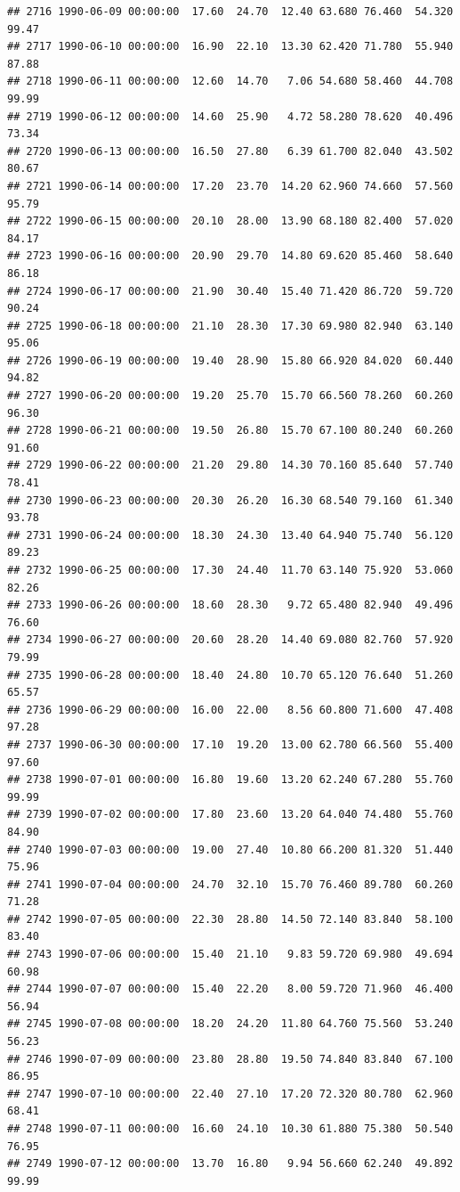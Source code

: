\documentclass{article}\usepackage{graphicx, color}
\makeatletter
\newenvironment{kframe}{%
 \def\at@end@of@kframe{}%
 \ifinner\ifhmode%
  \def\at@end@of@kframe{\end{minipage}}%
  \begin{minipage}{\columnwidth}%
 \fi\fi%
 \def\FrameCommand##1{\hskip\@totalleftmargin \hskip-\fboxsep
 \colorbox{shadecolor}{##1}\hskip-\fboxsep
     \hskip-\linewidth \hskip-\@totalleftmargin \hskip\columnwidth}%
 \MakeFramed {\advance\hsize-\width
   \@totalleftmargin\z@ \linewidth\hsize
   \@setminipage}}%
 {\par\unskip\endMakeFramed%
 \at@end@of@kframe}
\newenvironment{knitrout}{}{} %
\makeatother
\begin{document}
\begin{knitrout}
\begin{kframe}
\begin{verbatim}
## 2716 1990-06-09 00:00:00  17.60  24.70  12.40 63.680 76.460  54.320  99.47
## 2717 1990-06-10 00:00:00  16.90  22.10  13.30 62.420 71.780  55.940  87.88
## 2718 1990-06-11 00:00:00  12.60  14.70   7.06 54.680 58.460  44.708  99.99
## 2719 1990-06-12 00:00:00  14.60  25.90   4.72 58.280 78.620  40.496  73.34
## 2720 1990-06-13 00:00:00  16.50  27.80   6.39 61.700 82.040  43.502  80.67
## 2721 1990-06-14 00:00:00  17.20  23.70  14.20 62.960 74.660  57.560  95.79
## 2722 1990-06-15 00:00:00  20.10  28.00  13.90 68.180 82.400  57.020  84.17
## 2723 1990-06-16 00:00:00  20.90  29.70  14.80 69.620 85.460  58.640  86.18
## 2724 1990-06-17 00:00:00  21.90  30.40  15.40 71.420 86.720  59.720  90.24
## 2725 1990-06-18 00:00:00  21.10  28.30  17.30 69.980 82.940  63.140  95.06
## 2726 1990-06-19 00:00:00  19.40  28.90  15.80 66.920 84.020  60.440  94.82
## 2727 1990-06-20 00:00:00  19.20  25.70  15.70 66.560 78.260  60.260  96.30
## 2728 1990-06-21 00:00:00  19.50  26.80  15.70 67.100 80.240  60.260  91.60
## 2729 1990-06-22 00:00:00  21.20  29.80  14.30 70.160 85.640  57.740  78.41
## 2730 1990-06-23 00:00:00  20.30  26.20  16.30 68.540 79.160  61.340  93.78
## 2731 1990-06-24 00:00:00  18.30  24.30  13.40 64.940 75.740  56.120  89.23
## 2732 1990-06-25 00:00:00  17.30  24.40  11.70 63.140 75.920  53.060  82.26
## 2733 1990-06-26 00:00:00  18.60  28.30   9.72 65.480 82.940  49.496  76.60
## 2734 1990-06-27 00:00:00  20.60  28.20  14.40 69.080 82.760  57.920  79.99
## 2735 1990-06-28 00:00:00  18.40  24.80  10.70 65.120 76.640  51.260  65.57
## 2736 1990-06-29 00:00:00  16.00  22.00   8.56 60.800 71.600  47.408  97.28
## 2737 1990-06-30 00:00:00  17.10  19.20  13.00 62.780 66.560  55.400  97.60
## 2738 1990-07-01 00:00:00  16.80  19.60  13.20 62.240 67.280  55.760  99.99
## 2739 1990-07-02 00:00:00  17.80  23.60  13.20 64.040 74.480  55.760  84.90
## 2740 1990-07-03 00:00:00  19.00  27.40  10.80 66.200 81.320  51.440  75.96
## 2741 1990-07-04 00:00:00  24.70  32.10  15.70 76.460 89.780  60.260  71.28
## 2742 1990-07-05 00:00:00  22.30  28.80  14.50 72.140 83.840  58.100  83.40
## 2743 1990-07-06 00:00:00  15.40  21.10   9.83 59.720 69.980  49.694  60.98
## 2744 1990-07-07 00:00:00  15.40  22.20   8.00 59.720 71.960  46.400  56.94
## 2745 1990-07-08 00:00:00  18.20  24.20  11.80 64.760 75.560  53.240  56.23
## 2746 1990-07-09 00:00:00  23.80  28.80  19.50 74.840 83.840  67.100  86.95
## 2747 1990-07-10 00:00:00  22.40  27.10  17.20 72.320 80.780  62.960  68.41
## 2748 1990-07-11 00:00:00  16.60  24.10  10.30 61.880 75.380  50.540  76.95
## 2749 1990-07-12 00:00:00  13.70  16.80   9.94 56.660 62.240  49.892  99.99

\end{verbatim}
\end{kframe}
\end{knitrout}
\end{document}
